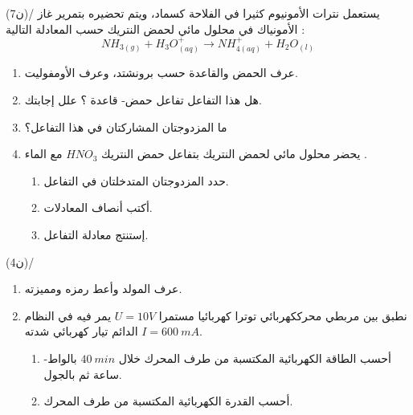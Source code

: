 \documentclass[14pt,a4paper]{extarticle}
\begin{document}
\vspace{-0.5 cm}
\begin{exercice}{(7ن)}/
\vspace{-0.2 cm}
يستعمل نترات الأمونيوم كثيرا في الفلاحة كسماد، ويتم تحضيره بتمرير غاز الأمونياك في محلول مائي لحمض النتريك حسب المعادلة التالية :
$$NH_{3(g)} + H_3O^+_{(aq)} \rightarrow NH^+_{4(aq)} + H_2O_{(l)}$$
\begin{enumerate}
\vspace{-0.2 cm}
\item عرف الحمض والقاعدة حسب برونشتد، وعرف الأومفوليت.
\vspace{-0.2 cm}
\item هل هذا التفاعل تفاعل حمض- قاعدة ؟ علل إجابتك.
\vspace{-0.2 cm}
\item ما المزدوجتان المشاركتان في هذا التفاعل؟
\vspace{-0.2 cm}
\item يحضر محلول مائي لحمض النتريك بتفاعل حمض النتريك
$HNO_3$
 مع الماء .
 \begin{enumerate}
 \item حدد المزدوجتان المتدخلتان في التفاعل.
 \item أكتب أنصاف المعادلات.
 \item إستنتج معادلة التفاعل.
 \end{enumerate}
\end{enumerate}
\end{exercice}%
\vspace{-0.7 cm}
\begin{exercice}{(4ن)}/
\vspace{-0.3 cm}
\begin{enumerate}
\vspace{-0.2cm}
\item عرف المولد وأعط رمزه ومميزته. 
\vspace{-0.2cm}
\item نطبق بين مربطي محرككهربائي توترا كهربائيا مستمرا 
$U = 10V$
يمر فيه في النظام الدائم تيار كهربائي شدته 
$I=600\ mA$.
\begin{enumerate}
\vspace{-0.2cm}
\item  أحسب الطاقة الكهربائية المكتسبة من طرف المحرك خلال 
$40\ min$
بالواط-ساعة ثم بالجول.
\item أحسب القدرة الكهربائية المكتسبة من طرف المحرك.
\end{enumerate}
\end{enumerate}
\end{exercice}%
\end{document}

